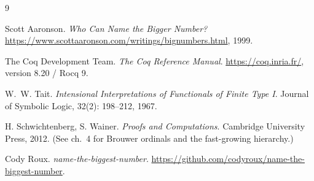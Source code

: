 \documentclass[11pt,a4paper]{article}
\theoremstyle{plain}
\theoremstyle{definition}
\theoremstyle{remark}
\begin{document}
\begin{thebibliography}{9}

Scott Aaronson.
\emph{Who Can Name the Bigger Number?}
\url{https://www.scottaaronson.com/writings/bignumbers.html}, 1999.

The Coq Development Team.
\emph{The Coq Reference Manual}.
\url{https://coq.inria.fr/}, version 8.20 / Rocq 9.

W.~W. Tait.
\emph{Intensional Interpretations of Functionals of Finite Type I}.
Journal of Symbolic Logic, 32(2): 198--212, 1967.

H. Schwichtenberg, S. Wainer.
\emph{Proofs and Computations}.
Cambridge University Press, 2012.
(See ch.~4 for Brouwer ordinals and the fast-growing hierarchy.)

Cody Roux.
\emph{name-the-biggest-number}.
\url{https://github.com/codyroux/name-the-biggest-number}.

\end{thebibliography}
\end{document}
